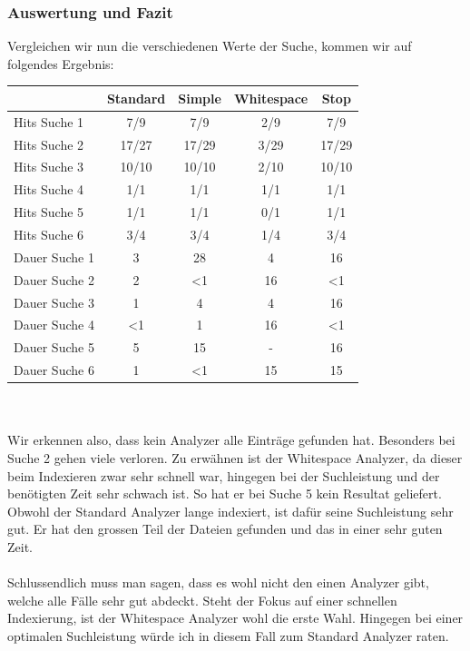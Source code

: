 \documentclass[12pt,a4paper,ngerman]{report}
\begin{document}
\subsubsection{Auswertung und Fazit}
Vergleichen wir nun die verschiedenen Werte der Suche, kommen wir auf folgendes Ergebnis: \\
\begin{tabular}{|l|c|c|c|c|} \hline
 & \textbf{Standard} & \textbf{Simple} & \textbf{Whitespace} & \textbf{Stop} \\ \hline
Hits Suche 1 & 7/9 & 7/9 & 2/9 & 7/9\\
Hits Suche 2 & 17/27 & 17/29 & 3/29 & 17/29\\
Hits Suche 3 & 10/10 & 10/10 & 2/10 & 10/10\\
Hits Suche 4 & 1/1 & 1/1 & 1/1 & 1/1\\
Hits Suche 5 & 1/1 & 1/1 & 0/1 & 1/1\\
Hits Suche 6 & 3/4 & 3/4& 1/4 & 3/4\\ \hline
Dauer Suche 1 & 3 & 28 & 4 & 16\\
Dauer Suche 2 & 2 & \textless 1 & 16 & \textless 1\\
Dauer Suche 3 & 1 & 4 & 4 & 16\\
Dauer Suche 4 & \textless 1 & 1 & 16 & \textless 1\\
Dauer Suche 5 & 5 & 15 & - & 16\\
Dauer Suche 6 & 1 & \textless 1 & 15 & 15\\ \hline
\end{tabular} \\ \\
Wir erkennen also, dass kein Analyzer alle Einträge gefunden hat. Besonders bei Suche 2 gehen viele verloren. Zu erwähnen ist der Whitespace Analyzer, da dieser beim Indexieren zwar sehr schnell war, hingegen bei der Suchleistung und der benötigten Zeit sehr schwach ist. So hat er bei Suche 5 kein Resultat geliefert. Obwohl der Standard Analyzer lange indexiert, ist dafür seine Suchleistung sehr gut. Er hat den grossen Teil der Dateien gefunden und das in einer sehr guten Zeit.\\
\\
Schlussendlich muss man sagen, dass es wohl nicht den einen Analyzer gibt, welche alle Fälle sehr gut abdeckt. Steht der Fokus auf einer schnellen Indexierung, ist der Whitespace Analyzer wohl die erste Wahl. Hingegen bei einer optimalen Suchleistung würde ich in diesem Fall zum Standard Analyzer raten.
\newpage
\end{document}
